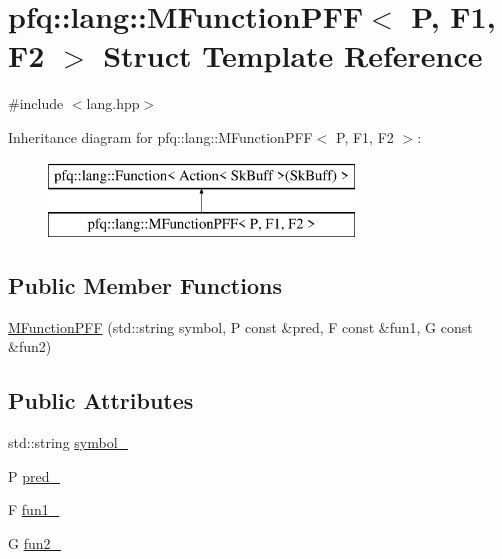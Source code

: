 \hypertarget{structpfq_1_1lang_1_1MFunctionPFF}{\section{pfq\+:\+:lang\+:\+:M\+Function\+P\+F\+F$<$ P, F1, F2 $>$ Struct Template Reference}
\label{structpfq_1_1lang_1_1MFunctionPFF}
}


{\ttfamily \#include $<$lang.\+hpp$>$}

Inheritance diagram for pfq\+:\+:lang\+:\+:M\+Function\+P\+F\+F$<$ P, F1, F2 $>$\+:\begin{figure}[H]
\begin{center}
\leavevmode
\includegraphics[height=2.000000cm]{structpfq_1_1lang_1_1MFunctionPFF}
\end{center}
\end{figure}
\subsection*{Public Member Functions}
\begin{DoxyCompactItemize}
\item 
\hyperlink{structpfq_1_1lang_1_1MFunctionPFF_ac9f3ef67aef8cc6ffc5442e6cce95c10}{M\+Function\+P\+F\+F} (std\+::string symbol, P const \&pred, F const \&fun1, G const \&fun2)
\end{DoxyCompactItemize}
\subsection*{Public Attributes}
\begin{DoxyCompactItemize}
\item 
std\+::string \hyperlink{structpfq_1_1lang_1_1MFunctionPFF_a6685526768fbc7966bb1a0785b88546d}{symbol\+\_\+}
\item 
P \hyperlink{structpfq_1_1lang_1_1MFunctionPFF_a345690a131a4445a14b5e26f2e3db4cf}{pred\+\_\+}
\item 
F \hyperlink{structpfq_1_1lang_1_1MFunctionPFF_a7493c23483456135e4b6e87a1da287b1}{fun1\+\_\+}
\item 
G \hyperlink{structpfq_1_1lang_1_1MFunctionPFF_a81926e88edcadc9145f773fbba260b1a}{fun2\+\_\+}
\end{DoxyCompactItemize}
